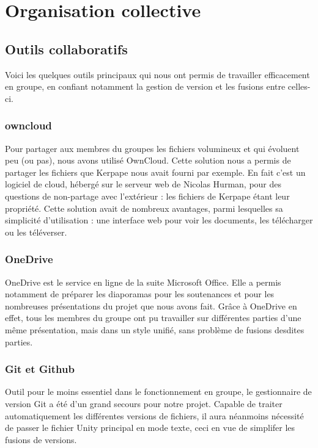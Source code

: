 \section{Organisation collective}

\subsection{Outils collaboratifs}

Voici les quelques outils principaux qui nous ont permis de travailler efficacement en groupe, en confiant notamment la gestion de version et les fusions entre celles-ci.

\subsubsection{owncloud}

Pour partager aux membres du groupes les fichiers volumineux et qui évoluent peu (ou pas), nous avons utilisé OwnCloud.
Cette solution nous a permis de partager les fichiers que Kerpape nous avait fourni par exemple. 
En fait c'est un logiciel de cloud, hébergé sur le serveur web de Nicolas Hurman, pour des questions de non-partage avec l'extérieur : les fichiers de Kerpape étant leur propriété.
Cette solution avait de nombreux avantages, parmi lesquelles sa simplicité d'utilisation : une interface web pour voir les documents, les télécharger ou les téléverser.

\subsubsection{OneDrive}

OneDrive est le service en ligne de la suite Microsoft Office.
Elle a permis notamment de préparer les diaporamas pour les soutenances et pour les nombreuses présentations du projet que nous avons fait.
Grâce à OneDrive en effet, tous les membres du groupe ont pu travailler sur différentes parties d'une même présentation, mais dans un style unifié, sans problème de fusions desdites parties.

\subsubsection{Git et Github}

Outil pour le moins essentiel dans le fonctionnement en groupe, le gestionnaire de version Git a été d'un grand secours pour notre projet.
Capable de traiter automatiquement les différentes versions de fichiers, il aura néanmoins nécessité de passer le fichier Unity principal en mode texte, ceci en vue de simplifer les fusions de versions.

